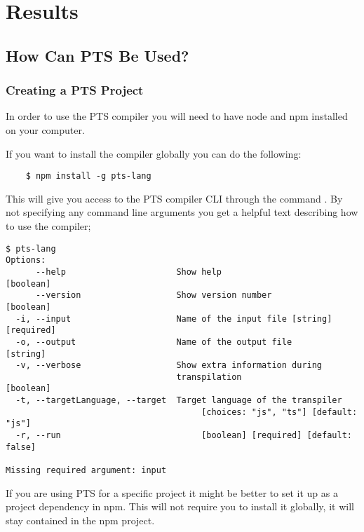 \chapter{Results}\label{ch:results}

\section{How Can PTS Be Used?}\label{sec:how-can-this-be-used?}

\subsection{Creating a PTS Project}\label{subsec:creating-a-pts-project}

In order to use the PTS compiler you will need to have node and npm installed on your computer.

If you want to install the compiler globally you can do the following:

\begin{verbatim}
    $ npm install -g pts-lang
\end{verbatim}

This will give you access to the PTS compiler CLI through the command .
By not specifying any command line arguments you get a helpful text describing how to use the compiler;

\begin{verbatim}
$ pts-lang
Options:
      --help                      Show help                        [boolean]
      --version                   Show version number              [boolean]
  -i, --input                     Name of the input file [string] [required]
  -o, --output                    Name of the output file           [string]
  -v, --verbose                   Show extra information during
                                  transpilation                    [boolean]
  -t, --targetLanguage, --target  Target language of the transpiler
                                       [choices: "js", "ts"] [default: "js"]
  -r, --run                            [boolean] [required] [default: false]

Missing required argument: input
\end{verbatim}

If you are using PTS for a specific project it might be better to set it up as a project dependency in npm.
This will not require you to install it globally, it will stay contained in the npm project.

